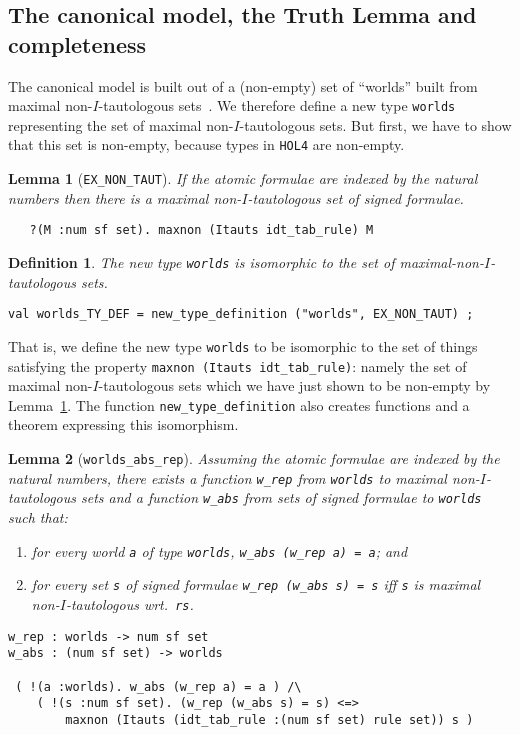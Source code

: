 \documentclass[a4paper]{article}
\newtheorem{lemma}{Lemma}
\newtheorem{definition}{Definition}
\newcommand{\hol}{\texttt{HOL4}}
\begin{document}
\subsection{The canonical model, the Truth Lemma and completeness}

The canonical model is built out of a (non-empty) set of ``worlds''
built from maximal non-$I$-tautologous
sets~\cite[just above Theorem~3]{fitting-dual-tableau}. We therefore define a new type
\texttt{worlds} representing the set of maximal non-$I$-tautologous
sets. But first, we have to show that this set is non-empty, because
types in \hol{} are non-empty.

\begin{lemma}[\texttt{EX\_NON\_TAUT}]\label{EX-NON-TAUT}
If the atomic formulae are indexed by the natural numbers
then there is a maximal non-$I$-tautologous set of signed formulae.
\begin{verbatim}
   ?(M :num sf set). maxnon (Itauts idt_tab_rule) M
\end{verbatim}
\end{lemma}

\begin{definition}
  The new type \texttt{worlds} is isomorphic to the set of 
  maximal-non-$I$-tautologous sets.
\begin{verbatim}
val worlds_TY_DEF = new_type_definition ("worlds", EX_NON_TAUT) ;
\end{verbatim}
\end{definition}

That is, we define the new type \texttt{worlds} to be isomorphic to
the set of things satisfying the property \texttt{maxnon (Itauts
  idt\_tab\_rule)}: namely the set of maximal non-$I$-tautologous sets
which we have just shown to be non-empty by
Lemma~\ref{EX-NON-TAUT}.
%
The function \texttt{new\_type\_definition} also creates functions
and a theorem expressing this isomorphism.

\begin{lemma}[\texttt{worlds\_abs\_rep}]
Assuming the atomic formulae are indexed by the natural numbers,
there exists a function \texttt{w\_rep} from \texttt{worlds} to 
maximal non-$I$-tautologous sets 
and a function \texttt{w\_abs} from 
sets of signed formulae to \texttt{worlds} such that:
\begin{enumerate}
\item for every world \texttt{a} of type \texttt{worlds}, \texttt{w\_abs
    (w\_rep a) = a}; and
\item for every set \texttt{s} of signed formulae 
  \texttt{w\_rep (w\_abs s) = s} iff \texttt{s} is
  maximal non-$I$-tautologous wrt.\ \texttt{rs}.
\end{enumerate}
\begin{verbatim}
w_rep : worlds -> num sf set
w_abs : (num sf set) -> worlds

 ( !(a :worlds). w_abs (w_rep a) = a ) /\ 
    ( !(s :num sf set). (w_rep (w_abs s) = s) <=> 
        maxnon (Itauts (idt_tab_rule :(num sf set) rule set)) s )
\end{verbatim}
\end{lemma}
\end{document}
